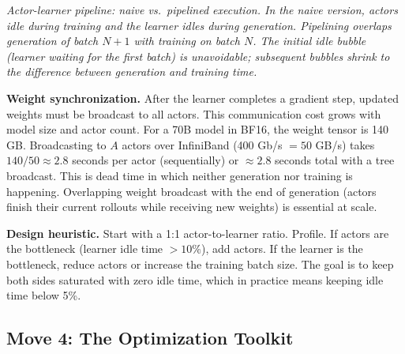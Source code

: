 \begin{center}
\end{center}

\smallskip
{\small\textit{Actor-learner pipeline: naive vs.\ pipelined execution. In the naive version, actors idle during training and the learner idles during generation. Pipelining overlaps generation of batch $N+1$ with training on batch $N$. The initial idle bubble (learner waiting for the first batch) is unavoidable; subsequent bubbles shrink to the difference between generation and training time.}}

\medskip

\textbf{Weight synchronization.} After the learner completes a gradient step, updated weights must be broadcast to all actors. This communication cost grows with model size and actor count. For a 70B model in BF16, the weight tensor is 140 GB. Broadcasting to $A$ actors over InfiniBand (400 Gb/s $= 50$ GB/s) takes $140/50 \approx 2.8$ seconds per actor (sequentially) or $\approx 2.8$ seconds total with a tree broadcast. This is dead time in which neither generation nor training is happening. Overlapping weight broadcast with the end of generation (actors finish their current rollouts while receiving new weights) is essential at scale.

\textbf{Design heuristic.} Start with a 1:1 actor-to-learner ratio. Profile. If actors are the bottleneck (learner idle time $> 10\%$), add actors. If the learner is the bottleneck, reduce actors or increase the training batch size. The goal is to keep both sides saturated with zero idle time, which in practice means keeping idle time below 5\%.

\subsection*{Move 4: The Optimization Toolkit}

